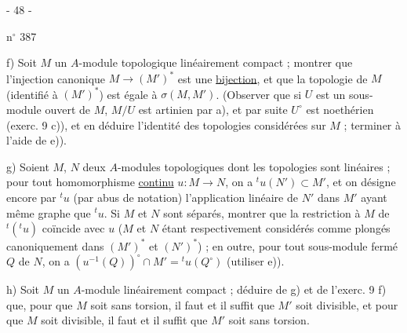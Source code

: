 \begin{center}- 48 -\end{center}
\hfill n$^\circ$ 387

f) Soit $M$ un $A$-module topologique linéairement compact ; montrer que l'injection canonique $M\longrightarrow(M')^*$ est une \uline{bijection}, et que la topologie de $M$ (identifié à $(M')^*$) est égale à $\sigma(M,M')$. (Observer que si $U$ est un sous-module ouvert de $M$, $M/U$ est artinien par a), et par suite $U^\circ$ est noethérien (exerc. 9 c)), et en déduire l'identité des topologies considérées sur $M$ ; terminer à l'aide de e)).

g) Soient $M$, $N$ deux $A$-modules topologiques dont les topologies sont linéaires ; pour tout homomorphisme \uline{continu} $u:M\longrightarrow N$, on a ${}^tu(N')\subset M'$, et on désigne encore par ${}^tu$ (par abus de notation) l'application linéaire de $N'$ dans $M'$ ayant même graphe que ${}^tu$. Si $M$ et $N$ sont séparés, montrer que la restriction à $M$ de ${}^t({}^tu)$ coïncide avec $u$ ($M$ et $N$ étant respectivement considérés comme plongés canoniquement dans $(M')^*$ et $(N')^*$) ; en outre, pour tout sous-module fermé $Q$ de $N$, on a $(u^{-1}(Q))^\circ\cap M'={}^tu(Q^\circ)$ (utiliser e)).

h) Soit $M$ un $A$-module linéairement compact ; déduire de g) et de l'exerc. 9 f) que, pour que $M$ soit sans torsion, il faut et il suffit que $M'$ soit divisible, et pour que $M$ soit divisible, il faut et il suffit que $M'$ soit sans torsion.

\begin{center}\unsure{-:-:-:-}\end{center}

